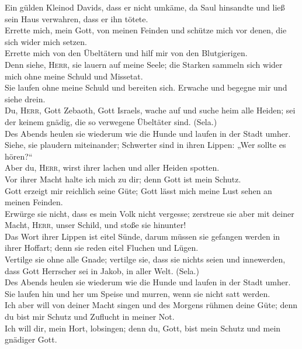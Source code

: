  Ein gülden Kleinod Davids, dass er nicht umkäme, da Saul
hinsandte und ließ sein Haus verwahren, dass er ihn tötete.\\
 Errette mich, mein Gott, von meinen Feinden und schütze
mich vor denen, die sich wider mich setzen.\\
 Errette mich von den Übeltätern und hilf mir von den
Blutgierigen.\\
 Denn siehe, \textsc{Herr}, sie lauern auf meine Seele;
die Starken sammeln sich wider mich ohne meine Schuld und Missetat.\\
 Sie laufen ohne meine Schuld und bereiten sich. Erwache
und begegne mir und siehe drein.\\
 Du, \textsc{Herr}, Gott Zebaoth, Gott Israels, wache auf
und suche heim alle Heiden; sei der keinem gnädig, die so verwegene
Übeltäter sind. (Sela.)\\
 Des Abends heulen sie wiederum wie die Hunde und laufen
in der Stadt umher.\\
 Siehe, sie plaudern miteinander; Schwerter sind in ihren
Lippen: „Wer sollte es hören?{}``\\
 Aber du, \textsc{Herr}, wirst ihrer lachen und aller
Heiden spotten.\\
 Vor ihrer Macht halte ich mich zu dir; denn Gott ist
mein Schutz.\\
 Gott erzeigt mir reichlich seine Güte; Gott lässt mich
meine Lust sehen an meinen Feinden.\\
 Erwürge sie nicht, dass es mein Volk nicht vergesse;
zerstreue sie aber mit deiner Macht, \textsc{Herr}, unser Schild, und
stoße sie hinunter!\\
 Das Wort ihrer Lippen ist eitel Sünde, darum müssen sie
gefangen werden in ihrer Hoffart; denn sie reden eitel Fluchen und
Lügen.\\
 Vertilge sie ohne alle Gnade; vertilge sie, dass sie
nichts seien und innewerden, dass Gott Herrscher sei in Jakob, in aller
Welt. (Sela.)\\
 Des Abends heulen sie wiederum wie die Hunde und laufen
in der Stadt umher.\\
 Sie laufen hin und her um Speise und murren, wenn sie
nicht satt werden.\\
 Ich aber will von deiner Macht singen und des Morgens
rühmen deine Güte; denn du bist mir Schutz und Zuflucht in meiner Not.\\
 Ich will dir, mein Hort, lobsingen; denn du, Gott, bist
mein Schutz und mein gnädiger Gott.

